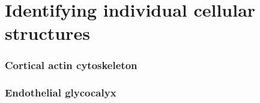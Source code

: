 \part{Identifying individual cellular structures}

\section{Cortical actin cytoskeleton}

\section{Endothelial glycocalyx}